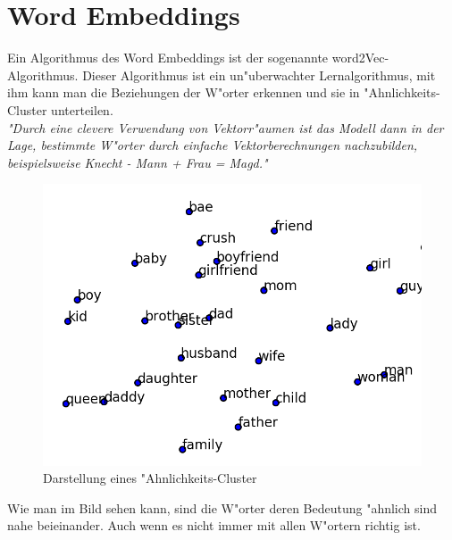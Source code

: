 \section{Word Embeddings}
Ein Algorithmus des Word Embeddings ist der sogenannte word2Vec-Algorithmus. Dieser Algorithmus ist ein un"uberwachter Lernalgorithmus, mit ihm kann man die Beziehungen der W"orter erkennen und sie in "Ahnlichkeits-Cluster unterteilen.\\
\textit{"Durch eine clevere Verwendung von Vektorr"aumen ist das Modell dann in der Lage, bestimmte W"orter durch einfache Vektorberechnungen nachzubilden, beispielsweise Knecht - Mann + Frau = Magd."}
\cite{raschka:2017}
\begin{figure}[bth]
\includegraphics[width=15cm]{Graphics/cluster.png}\caption["Ahnlichkeits-Cluster]{Darstellung eines "Ahnlichkeits-Cluster  \cite{marivate:2017}}
\end{figure}

Wie man im Bild sehen kann, sind die W"orter deren Bedeutung "ahnlich sind nahe beieinander. Auch wenn es nicht immer mit allen W"ortern richtig ist. 


